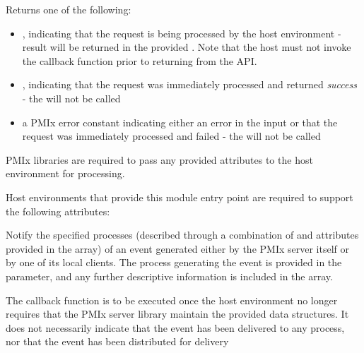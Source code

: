 Returns one of the following:

\begin{itemize}
    \item {}, indicating that the request is being processed by the host environment - result will be returned in the provided . Note that the host must not invoke the callback function prior to returning from the \ac{API}.
    \item {}, indicating that the request was immediately processed and returned \textit{success} - the  will not be called
    \item a PMIx error constant indicating either an error in the input or that the request was immediately processed and failed - the  will not be called
\end{itemize}

\reqattrstart
\ac{PMIx} libraries are required to pass any provided attributes to the host environment for processing.

\divider

Host environments that provide this module entry point are required to support the following attributes:


\reqattrend

\descr

Notify the specified processes (described through a combination of  and attributes provided in the  array) of an event generated either by the \ac{PMIx} server itself or by one of its local clients.
The process generating the event is provided in the  parameter, and any further descriptive information is
included in the  array.

\advicermstart
The callback function is to be executed once the host environment no longer requires that the \ac{PMIx} server library maintain the provided data structures. It does not necessarily indicate that the event has been delivered to any process, nor that the event has been distributed for delivery
\advicermend


\subsection{}

\summary

